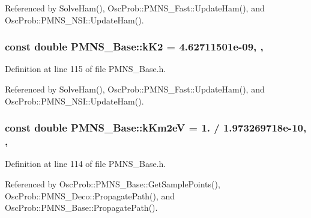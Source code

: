Referenced by Solve\+Ham(), Osc\+Prob\+::\+P\+M\+N\+S\+\_\+\+Fast\+::\+Update\+Ham(), and Osc\+Prob\+::\+P\+M\+N\+S\+\_\+\+N\+S\+I\+::\+Update\+Ham().

\subsubsection[{\texorpdfstring{k\+K2}{kK2}}]{\setlength{\rightskip}{0pt plus 5cm}const double P\+M\+N\+S\+\_\+\+Base\+::k\+K2 = 4.\+62711501e-\/09\hspace{0.3cm}{\ttfamily [static]}, {\ttfamily [protected]}, {\ttfamily [inherited]}}\hypertarget{classOscProb_1_1PMNS__Base_a326fc5016d7dd7ce05682c06cdcb6d94}{}\label{classOscProb_1_1PMNS__Base_a326fc5016d7dd7ce05682c06cdcb6d94}


Definition at line 115 of file P\+M\+N\+S\+\_\+\+Base.\+h.



Referenced by Solve\+Ham(), Osc\+Prob\+::\+P\+M\+N\+S\+\_\+\+Fast\+::\+Update\+Ham(), and Osc\+Prob\+::\+P\+M\+N\+S\+\_\+\+N\+S\+I\+::\+Update\+Ham().

\subsubsection[{\texorpdfstring{k\+Km2eV}{kKm2eV}}]{\setlength{\rightskip}{0pt plus 5cm}const double P\+M\+N\+S\+\_\+\+Base\+::k\+Km2eV = 1. / 1.\+973269718e-\/10\hspace{0.3cm}{\ttfamily [static]}, {\ttfamily [protected]}, {\ttfamily [inherited]}}\hypertarget{classOscProb_1_1PMNS__Base_a382ddd7b76ca89b43f22614a2ea7327b}{}\label{classOscProb_1_1PMNS__Base_a382ddd7b76ca89b43f22614a2ea7327b}


Definition at line 114 of file P\+M\+N\+S\+\_\+\+Base.\+h.



Referenced by Osc\+Prob\+::\+P\+M\+N\+S\+\_\+\+Base\+::\+Get\+Sample\+Points(), Osc\+Prob\+::\+P\+M\+N\+S\+\_\+\+Deco\+::\+Propagate\+Path(), and Osc\+Prob\+::\+P\+M\+N\+S\+\_\+\+Base\+::\+Propagate\+Path().

